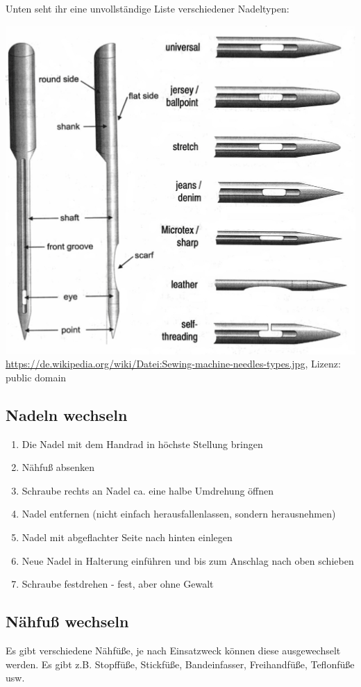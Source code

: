 \documentclass{\basedir/fablab-document}
\begin{document}
Unten seht ihr eine unvollständige Liste verschiedener Nadeltypen:
\begin{center}
	\includegraphics[width=\linewidth/2]{Sewing-machine-needles-types.jpg}
	\url{https://de.wikipedia.org/wiki/Datei:Sewing-machine-needles-types.jpg}, Lizenz: public domain
\end{center}

\subsection{Nadeln wechseln}
\begin{enumerate}
	\item Die Nadel mit dem Handrad in höchste Stellung bringen
	\item Nähfuß absenken
	\item Schraube rechts an Nadel ca. eine halbe Umdrehung öffnen
	\item Nadel entfernen (nicht einfach herausfallenlassen, sondern herausnehmen)
	\item Nadel mit abgeflachter Seite nach hinten einlegen
	\item Neue Nadel in Halterung einführen und bis zum Anschlag nach oben schieben
	\item Schraube festdrehen - fest, aber ohne Gewalt
\end{enumerate}

\subsection{Nähfuß wechseln}
Es gibt verschiedene Nähfüße, je nach Einsatzweck können diese ausgewechselt werden. Es gibt z.B. Stopffüße, Stickfüße, Bandeinfasser, Freihandfüße, Teflonfüße usw. 
\end{document}
